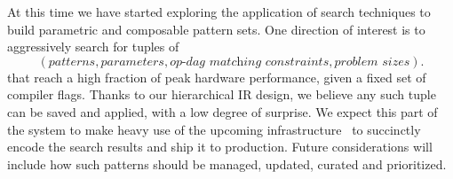 At this time we have started exploring the application of search techniques to build parametric and composable pattern sets. One  direction of interest is to aggressively search for tuples of
$$
(\textit{patterns}, \textit{parameters}, \textit{op-dag matching constraints}, \textit{problem sizes}).
$$
that reach a high fraction of peak hardware performance, given a fixed set of \LLVM compiler flags.
Thanks to our hierarchical IR design, we believe any such tuple can be saved and applied, with a low degree of surprise.
We expect this part of the system to make heavy use of the upcoming \PDLL  infrastructure~\cite{PDLL} to succinctly encode the search results and ship it to production.
Future considerations will include how such patterns should be managed, updated, curated and prioritized.
